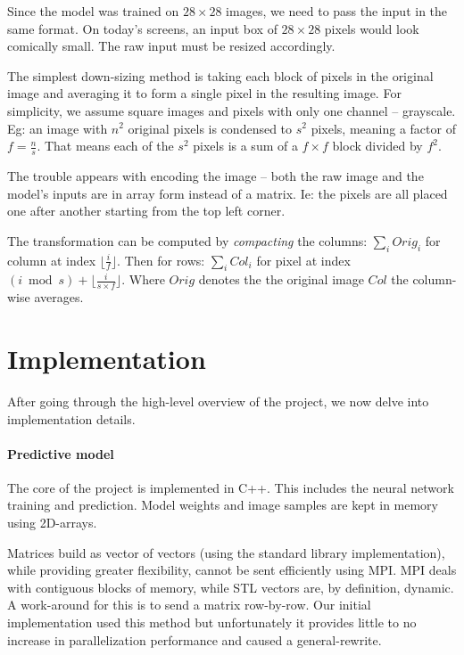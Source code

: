 \documentclass[a4paper]{article}
\newcommand{\floor}[1]{\lfloor {#1} \rfloor}
\begin{document}

\noindent Since the model was trained on $28 \times 28$ images, we need to pass the input in the same format. On today's screens, an input box of $28 \times 28$ pixels would look comically small. The raw input must be resized accordingly.

The simplest down-sizing method is taking each block of pixels in the original image and averaging it to form a single pixel in the resulting image. For simplicity, we assume square images and pixels with only one channel -- grayscale. Eg: an image with $n^2$ original pixels is condensed to $s^2$ pixels, meaning a factor of $f=\frac{n}{s}$. That means each of the $s^2$ pixels is a sum of a $f \times f$ block divided by $f^2$.

The trouble appears with encoding the image -- both the raw image and the model's inputs are in array form instead of a matrix. Ie: the pixels are all placed one after another starting from the top left corner.

The transformation can be computed by \textit{compacting} the columns:
$\sum_i Orig_i$ for column at index $\floor{\frac{i}{f}}$. Then for rows: $\sum_i Col_i$ for pixel at index $(i \bmod s) + \floor{\frac{i}{s \times f}}$. Where $Orig$ denotes the the original image $Col$ the column-wise averages. 







\newpage
\section{Implementation}
After going through the high-level overview of the project, we now delve into implementation details.

\paragraph{Predictive model} The core of the project is implemented in C++. This includes the neural network training and prediction. Model weights and image samples are kept in memory using 2D-arrays. 

Matrices build as vector of vectors (using the standard library implementation), while providing greater flexibility, cannot be sent efficiently using MPI. MPI deals with contiguous blocks of memory, while STL vectors are, by definition, dynamic. A work-around for this is to send a matrix row-by-row. Our initial implementation used this method but unfortunately it provides little to no increase in parallelization performance and caused a general-rewrite. 
\end{document}
